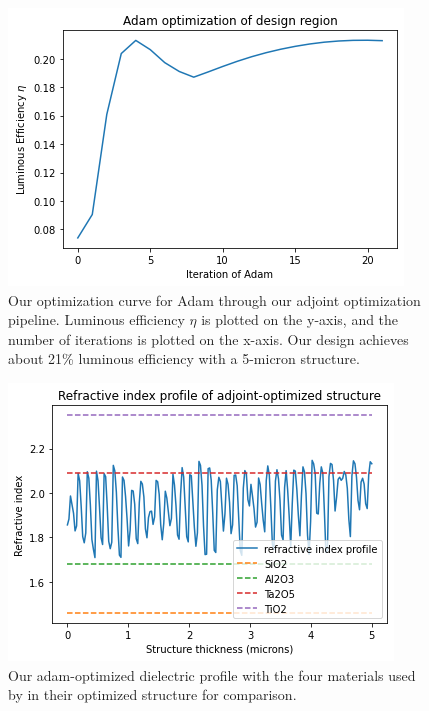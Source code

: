 \documentclass[%
 reprint,
 amsmath,amssymb,
 aps
]{revtex4-2}
\begin{document}
\begin{figure}
\centering
\includegraphics[width=1.\linewidth]{adam_plot.png}
\caption{Our optimization curve for Adam through our adjoint optimization pipeline. Luminous efficiency $\eta$ is plotted on the y-axis, and the number of iterations is plotted on the x-axis. Our design achieves about 21\% luminous efficiency with a 5-micron structure.} 
\label{adam_opt}
\end{figure}
\begin{figure}
\centering
\includegraphics[width=1.\linewidth]{adjoint_opt_struct.png}
\caption{Our adam-optimized dielectric profile with the four materials used by \cite{ilic} in their optimized structure for comparison.} 
\label{adam_struct}
\end{figure}
\end{document}
